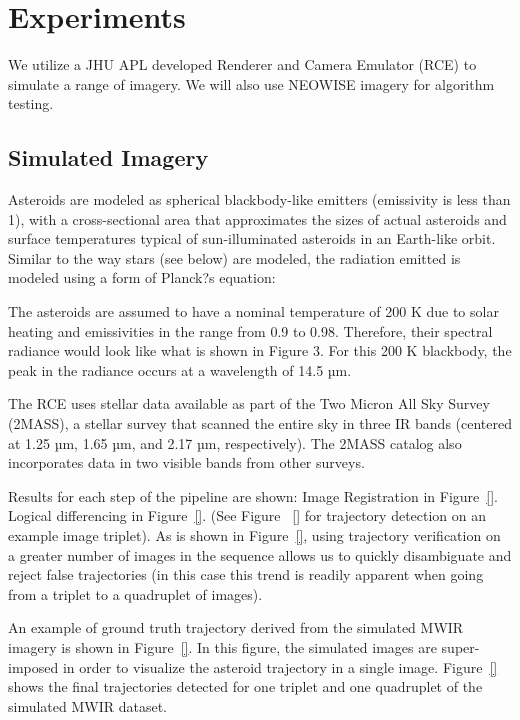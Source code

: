\section{Experiments}
\label{sec:experiments}

We  utilize a JHU APL developed Renderer and Camera Emulator (RCE) to simulate a range of imagery.  We will also use NEOWISE imagery for algorithm testing.  

\subsection{Simulated Imagery}
\label{ssec:simulated}

Asteroids are  modeled as spherical blackbody-like emitters (emissivity is less than 1), with a cross-sectional area that approximates the sizes of actual asteroids and surface temperatures typical of sun-illuminated asteroids in an Earth-like orbit.  Similar to the way stars (see below) are modeled, the radiation emitted is modeled using a form of Planck?s equation:
 
 The asteroids are assumed to have a nominal temperature of 200 K due to solar heating and emissivities in the range from 0.9 to 0.98. Therefore, their spectral radiance would look like what is shown in Figure 3.  For this 200 K blackbody, the peak in the radiance occurs at a wavelength of 14.5 µm.
 
 The RCE uses stellar data available as part of the Two Micron All Sky Survey (2MASS), a stellar survey that scanned the entire sky in three IR bands (centered at 1.25 µm, 1.65 µm, and 2.17 µm, respectively).  The 2MASS catalog also incorporates data in two visible bands from other surveys. 
 
Results for each step of the pipeline are shown:
 Image Registration in Figure~\ref{}. Logical differencing in Figure~\ref{}. (See Figure ~\ref{} for trajectory detection on an example image triplet).    As is shown in Figure~\ref{}, using trajectory verification on a greater number of images in the sequence allows us to quickly disambiguate and reject false trajectories (in this case this trend is readily apparent when going from a triplet to a quadruplet of images).

An example of ground truth trajectory derived from the simulated MWIR imagery is shown in Figure~\ref{}. In this figure, the simulated images are super-imposed in order to visualize the asteroid trajectory in a single image. Figure~\ref{} shows the final trajectories detected for one triplet and one quadruplet of the simulated MWIR dataset.
 
